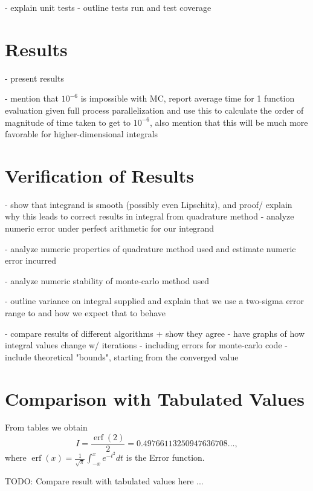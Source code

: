 \documentclass[10pt, a4paper]{article}
\begin{document}
- explain unit tests
- outline tests run and test coverage

\section{Results}

- present results

- mention that $10^{-6}$ is impossible with MC, report average time for 1 function evaluation given
  full process parallelization and use this to calculate the order of magnitude of time taken to
  get to $10^{-6}$, also mention that this will be much more favorable for higher-dimensional integrals

\section{Verification of Results}

- show that integrand is smooth (possibly even Lipschitz), and proof/ explain why this leads to
  correct results in integral from quadrature method
  - analyze numeric error under perfect arithmetic for our integrand

- analyze numeric properties of quadrature method used and estimate numeric error incurred

- analyze numeric stability of monte-carlo method used

- outline variance on integral supplied and explain that we use a two-sigma error range to
  and how we expect that to behave

- compare results of different algorithms + show they agree
- have graphs of how integral values change w/ iterations
  - including errors for monte-carlo code
  - include theoretical "bounds", starting from the converged value

{}


\appendix{}

\section{Comparison with Tabulated Values}
\label{app:cheat}
From tables we obtain
\begin{equation}
I = \frac{\operatorname{erf}(2)}{2} = 0.49766113250947636708 \dots,
\end{equation}
where $\operatorname{erf}(x) = \frac{1}{\sqrt\pi}\int_{-x}^x e^{-t^2} dt$ is the Error function.

TODO: Compare result with tabulated values here ...
\end{document}

